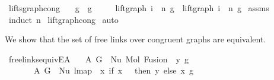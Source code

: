 \begin{isabellebody}
%
\isadelimproof
\isanewline
%
\endisadelimproof
\isanewline
\isanewline
{}\isamarkupfalse%
\ lifts{\isacharunderscore}{\kern0pt}graph{\isacharunderscore}{\kern0pt}cong{\isacharcolon}{\kern0pt}\isanewline
\ \ \ {\isachardoublequoteopen}g{}\ {\isasymsimeq}\ g{}{\isachardoublequoteclose}\isanewline
\ \ \ \ \ {\isachardoublequoteopen}{\isacharparenleft}{\kern0pt}lift{\isacharunderscore}{\kern0pt}graph\ i\ {\isacharcircum}{\kern0pt}{\isacharcircum}{\kern0pt}\ n{\isacharparenright}{\kern0pt}\ g{}\ {\isasymsimeq}\ {\isacharparenleft}{\kern0pt}lift{\isacharunderscore}{\kern0pt}graph\ i\ {\isacharcircum}{\kern0pt}{\isacharcircum}{\kern0pt}\ n{\isacharparenright}{\kern0pt}\ g{}{\isachardoublequoteclose}\isanewline
%
\isadelimproof
%
\endisadelimproof
%
\isatagproof
{}\isamarkupfalse%
\ assms\isanewline
{}\isamarkupfalse%
\ {\isacharparenleft}{\kern0pt}induct\ n{\isacharparenright}{\kern0pt}\isanewline
{}\isamarkupfalse%
\ lift{\isacharunderscore}{\kern0pt}graph{\isacharunderscore}{\kern0pt}cong\isanewline
{}\isamarkupfalse%
\ auto%
\endisatagproof
{\isafoldproof}%
%
\isadelimproof
%
\endisadelimproof
%
\isadelimdocument
%
\endisadelimdocument
%
\isatagdocument
%
\isamarkuptrue%
%
\isamarkuptrue%
%
\endisatagdocument
{\isafolddocument}%
%
\isadelimdocument
%
\endisadelimdocument
%
\begin{isamarkuptext}%
We show that the set of free links over congruent graphs are equivalent.%
\end{isamarkuptext}\isamarkuptrue%
\isamarkupfalse%
\ freelinks{\isacharunderscore}{\kern0pt}equiv{\isacharunderscore}{\kern0pt}E{}A{\isacharcolon}{\kern0pt}\isanewline
\ \ \ A{}{\isacharcolon}{\kern0pt}\ {\isachardoublequoteopen}G{}\ {\isacharequal}{\kern0pt}\ Nu\ {\isacharparenleft}{\kern0pt}Mol\ {\isacharparenleft}{\kern0pt}Fusion\ {}\ y{\isacharparenright}{\kern0pt}\ g{\isacharparenright}{\kern0pt}{\isachardoublequoteclose}\isanewline
\ \ \ \ \ \ \ A{}{\isacharcolon}{\kern0pt}\ {\isachardoublequoteopen}G{}\ {\isacharequal}{\kern0pt}\ Nu\ {\isacharparenleft}{\kern0pt}lmap\ {\isacharparenleft}{\kern0pt}{\isasymlambda}\ x{\isachardot}{\kern0pt}\ if\ x\ {\isacharequal}{\kern0pt}\ {}\ then\ y\ else\ x{\isacharparenright}{\kern0pt}\ g{\isacharparenright}{\kern0pt}{\isachardoublequoteclose}\isanewline

\end{isabellebody}
